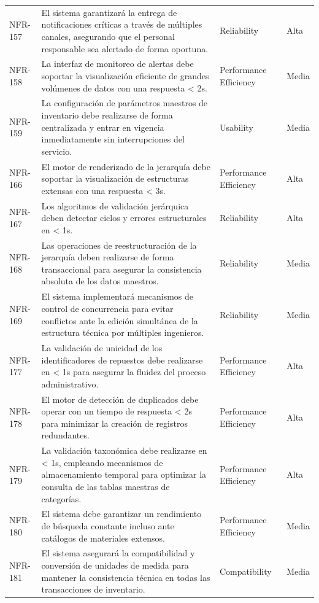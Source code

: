 \begin{longtable}{>{\raggedright\arraybackslash}p{} >{\raggedright\arraybackslash}p{} >{\raggedright\arraybackslash}p{} >{\raggedright\arraybackslash}p{}}
NFR-157 & El sistema garantizará la entrega de notificaciones críticas a través de múltiples canales, asegurando que el personal responsable sea alertado de forma oportuna. & Reliability & Alta \\
NFR-158 & La interfaz de monitoreo de alertas debe soportar la visualización eficiente de grandes volúmenes de datos con una respuesta < 2s. & Performance Efficiency & Media \\
NFR-159 & La configuración de parámetros maestros de inventario debe realizarse de forma centralizada y entrar en vigencia inmediatamente sin interrupciones del servicio. & Usability & Media \\
NFR-166 & El motor de renderizado de la jerarquía debe soportar la visualización de estructuras extensas con una respuesta < 3s. & Performance Efficiency & Alta \\
NFR-167 & Los algoritmos de validación jerárquica deben detectar ciclos y errores estructurales en < 1s. & Reliability & Alta \\
NFR-168 & Las operaciones de reestructuración de la jerarquía deben realizarse de forma transaccional para asegurar la consistencia absoluta de los datos maestros. & Reliability & Media \\
NFR-169 & El sistema implementará mecanismos de control de concurrencia para evitar conflictos ante la edición simultánea de la estructura técnica por múltiples ingenieros. & Reliability & Media \\
NFR-177 & La validación de unicidad de los identificadores de repuestos debe realizarse en < 1s para asegurar la fluidez del proceso administrativo. & Performance Efficiency & Alta \\
NFR-178 & El motor de detección de duplicados debe operar con un tiempo de respuesta < 2s para minimizar la creación de registros redundantes. & Performance Efficiency & Alta \\
NFR-179 & La validación taxonómica debe realizarse en < 1s, empleando mecanismos de almacenamiento temporal para optimizar la consulta de las tablas maestras de categorías. & Performance Efficiency & Alta \\
NFR-180 & El sistema debe garantizar un rendimiento de búsqueda constante incluso ante catálogos de materiales extensos. & Performance Efficiency & Media \\
NFR-181 & El sistema asegurará la compatibilidad y conversión de unidades de medida para mantener la consistencia técnica en todas las transacciones de inventario. & Compatibility & Media \\
\bottomrule
\end{longtable}
\normalsize